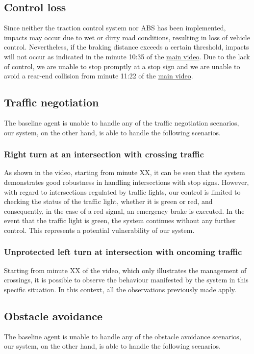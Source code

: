 \documentclass{article}
\begin{document}
\subsection{Control loss}
Since neither the traction control system nor ABS has been implemented, impacts may occur due to wet or dirty road conditions, 
resulting in loss of vehicle control. Nevertheless, if the braking distance exceeds a certain threshold, impacts will not occur as 
indicated in the minute 10:35 of the \href{https://www.youtube.com/watch?v=RBGWd_so80U}{main video}. Due to the lack of control, we are unable to stop promptly at a stop sign and we are unable to avoid a rear-end collision from minute 11:22 of the \href{https://www.youtube.com/watch?v=RBGWd_so80U}{main video}.

\subsection{Traffic negotiation}
The baseline agent is unable to handle any of the traffic negotiation scenarios, our system, on the other hand, is able to handle the following scenarios.
\subsubsection{Right turn at an intersection with crossing traffic}
As shown in the video, starting from minute XX, it can be seen that the system demonstrates good robustness in handling intersections with stop signs. However, 
with regard to intersections regulated by traffic lights, our control is limited to checking the status of the traffic light, whether it is green or red, and 
consequently, in the case of a red signal, an emergency brake is executed. In the event that the traffic light is green, the system continues without any 
further control. This represents a potential vulnerability of our system.
\subsubsection{Unprotected left turn at intersection with oncoming traffic}
Starting from minute XX of the video, which only illustrates the management of crossings, it is possible to observe the behaviour manifested by the system in 
this specific situation. In this context, all the observations previously made apply.

\subsection{Obstacle avoidance}
The baseline agent is unable to handle any of the obstacle avoidance scenarios, our system, on the other hand, is able to handle the following scenarios.
\end{document}
